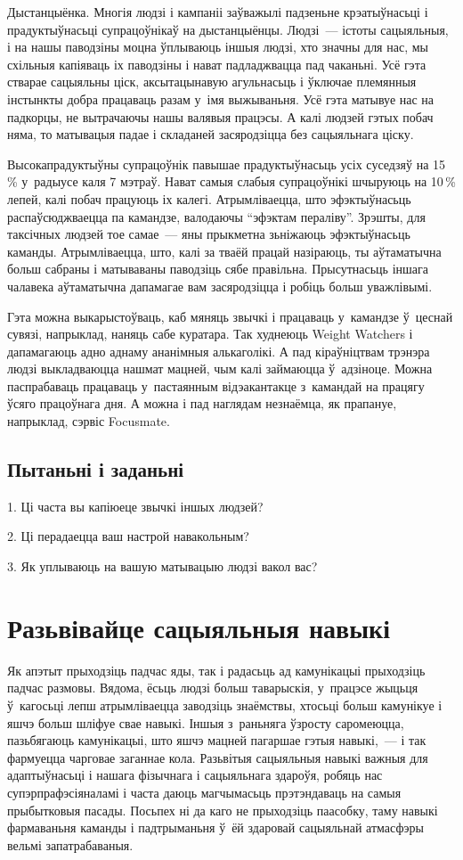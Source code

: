 Дыстанцыёнка. Многія людзі і кампаніі заўважылі падзеньне крэатыўнасьці і прадуктыўнасьці супрацоўнікаў на дыстанцыёнцы. Людзі~--- істоты сацыяльныя, і на нашы паводзіны моцна ўплываюць іншыя людзі, хто значны для нас, мы схільныя капіяваць іх паводзіны і нават падладжвацца пад чаканьні. Усё гэта стварае сацыяльны ціск, аксытацынавую агульнасьць і ўключае племянныя інстынкты добра працаваць разам у~імя выжываньня. Усё гэта матывуе нас на падкорцы, не вытрачаючы нашы валявыя працэсы. А калі людзей гэтых побач няма, то матывацыя падае і складаней засяродзіцца без сацыяльнага ціску.

Высокапрадуктыўны супрацоўнік павышае прадуктыўнасьць усіх суседзяў на 15\,\% у~радыусе каля 7 мэтраў. Нават самыя слабыя супрацоўнікі шчыруюць на 10\,\% лепей, калі побач працуюць іх калегі. Атрымліваецца, што эфэктыўнасьць распаўсюджваецца па камандзе, валодаючы ``эфэктам пераліву''. Зрэшты, для таксічных людзей тое самае~--- яны прыкметна зьніжаюць эфэктыўнасьць каманды. Атрымліваецца, што, калі за тваёй працай назіраюць, ты аўтаматычна больш сабраны і матываваны паводзіць сябе правільна. Прысутнасьць іншага чалавека аўтаматычна дапамагае вам засяродзіцца і робіць больш уважлівымі.

Гэта можна выкарыстоўваць, каб мяняць звычкі і працаваць у~камандзе ў~цеснай сувязі, напрыклад, наняць сабе куратара. Так худнеюць Weight Watchers і дапамагаюць адно аднаму ананімныя алькаголікі. А пад кіраўніцтвам трэнэра людзі выкладваюцца нашмат мацней, чым калі займаюцца ў~адзіноце. Можна паспрабаваць працаваць у~пастаянным відэакантакце з~камандай на працягу ўсяго працоўнага дня. А можна і пад наглядам незнаёмца, як прапануе, напрыклад, сэрвіс Focusmate.

\subsection*{Пытаньні і заданьні}

1. Ці часта вы капіюеце звычкі іншых людзей?

2. Ці перадаецца ваш настрой навакольным?

3. Як уплываюць на вашую матывацыю людзі вакол вас?


\section{Разьвівайце сацыяльныя навыкі}

Як апэтыт прыходзіць падчас яды, так і радасьць ад камунікацыі прыходзіць падчас размовы. Вядома, ёсьць людзі больш таварыскія, у~працэсе жыцьця ў~кагосьці лепш атрымліваецца заводзіць знаёмствы, хтосьці больш камунікуе і яшчэ больш шліфуе свае навыкі. Іншыя з~раньняга ўзросту саромеюцца, пазьбягаюць камунікацыі, што яшчэ мацней пагаршае гэтыя навыкі,~--- і так фармуецца чарговае заганнае кола. Разьвітыя сацыяльныя навыкі важныя для адаптыўнасьці і нашага фізычнага і сацыяльнага здароўя, робяць нас супэрпрафэсіяналамі і часта даюць магчымасьць прэтэндаваць на самыя прыбытковыя пасады. Посьпех ні да каго не прыходзіць паасобку, таму навыкі фармаваньня каманды і падтрыманьня ў~ёй здаровай сацыяльнай атмасфэры вельмі запатрабаваныя.

